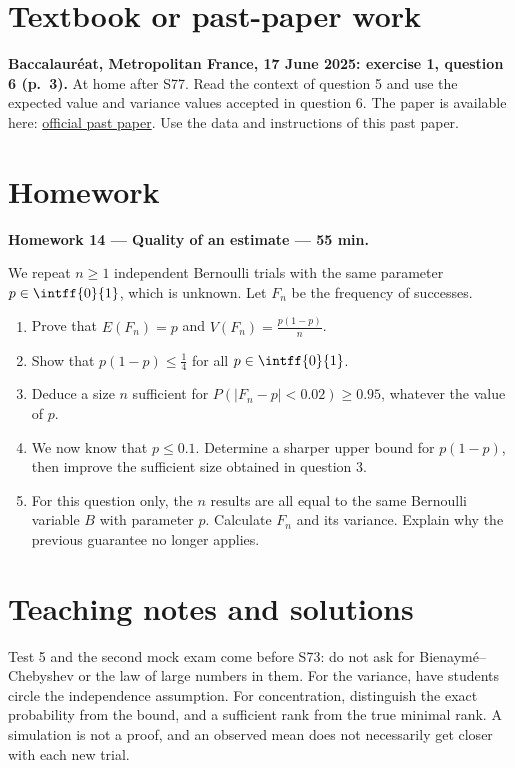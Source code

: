 \section{Textbook or past-paper work}\textbf{Baccalauréat, Metropolitan France, 17 June 2025: exercise 1, question 6 (p.~3).} At home after S77. Read the context of question 5 and use the expected value and variance values accepted in question 6. The paper is available here: \href{https://www.education.gouv.fr/sites/default/files/2025-06/baccalaur-at-g-n-ral-2025-math-matiques-440856.pdf}{official past paper}. Use the data and instructions of this past paper.

\mxnewpage
\section{Homework}\textbf{Homework 14 --- Quality of an estimate --- 55 min.}\par We repeat $n\ge1$ independent Bernoulli trials with the same parameter $p\in\intff{0}{1}$, which is unknown. Let $F_n$ be the frequency of successes.
\begin{enumerate}\item Prove that $E(F_n)=p$ and $V(F_n)=\frac{p(1-p)}n$.
\item Show that $p(1-p)\le\frac14$ for all $p\in\intff{0}{1}$.
\item Deduce a size $n$ sufficient for $P(|F_n-p|<\num{0,02})\ge\num{0,95}$, whatever the value of $p$.
\item We now know that $p\le\num{0,1}$. Determine a sharper upper bound for $p(1-p)$, then improve the sufficient size obtained in question 3.
\item For this question only, the $n$ results are all equal to the same Bernoulli variable $B$ with parameter $p$. Calculate $F_n$ and its variance. Explain why the previous guarantee no longer applies.\end{enumerate}

\ifmxteacher\mxnewpage\section{Teaching notes and solutions}\begin{teachernote}Test 5 and the second mock exam come before S73: do not ask for Bienaymé--Chebyshev or the law of large numbers in them. For the variance, have students circle the independence assumption. For concentration, distinguish the exact probability from the bound, and a sufficient rank from the true minimal rank. A simulation is not a proof, and an observed mean does not necessarily get closer with each new trial.\end{teachernote}

